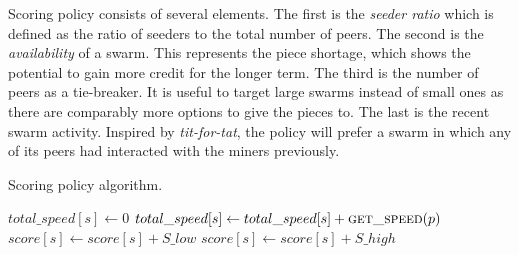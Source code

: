 Scoring policy consists of several elements. The first is the \textit{seeder ratio} which is defined as the ratio of seeders to the total number of peers. The second is the \textit{availability} of a swarm. This represents the piece shortage, which shows the potential to gain more credit for the longer term. The third is the number of peers as a tie-breaker. It is useful to target large swarms instead of small ones as there are comparably more options to give the pieces to. The last is the recent swarm  activity. Inspired by \textit{tit-for-tat}, the policy will prefer a swarm in which any of its peers had interacted with the miners previously.


\begin{algorithm}[h]
	\caption{Scoring policy algorithm.}
	\label{alg:scorep}
	\begin{algorithmic}[1]
		\Statex
		\Statex
						\State $total\_speed[s] \gets 0$
				\State $total\_speed[s] \gets total\_speed[s] + \Call{get\_speed}{p}$
			\EndFor
		\EndFor
		\State {}
				\State $score[s] \gets score[s] + S\_low$
			\Else{\null}
				\State $score[s] \gets score[s] + S\_high$
			\EndIf
		\EndFor
		\State {}
	\end{algorithmic}
\end{algorithm}

